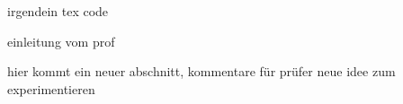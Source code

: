 irgendein tex code

einleitung vom prof

hier kommt ein neuer abschnitt, kommentare für prüfer
neue idee zum experimentieren
